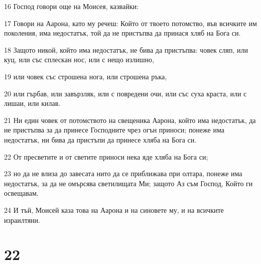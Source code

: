 \par 16 Господ говори още на Моисея, казвайки:
\par 17 Говори на Аарона, като му речеш: Който от твоето потомство, във всичките им поколения, има недостатък, той да не пристъпва да принася хляб на Бога си.
\par 18 Защото никой, който има недостатък, не бива да пристъпва: човек сляп, или куц, или със сплескан нос, или с нещо излишно,
\par 19 или човек със строшена нога, или строшена ръка,
\par 20 или гърбав, или завързляк, или с повредени очи, или със суха краста, или с лишаи, или килав.
\par 21 Ни един човек от потомството на свещеника Аарона, който има недостатък, да не пристъпва за да принесе Господните чрез огън приноси; понеже има недостатък, ни бива да пристъпи да принесе хляба на Бога си.
\par 22 От пресветите и от светите приноси нека яде хляба на Бога си;
\par 23 но да не влиза до завесата нито да се приближава при олтара, понеже има недостатък, за да не омърсява светилищата Ми; защото Аз съм Господ, Който ги освещавам.
\par 24 И тъй, Моисей каза това на Аарона и на синовете му, и на всичките израилтяни.

\chapter{22}

